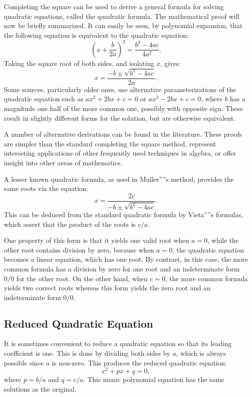Completing the square can be used to derive a general formula for solving quadratic
equations, called the quadratic formula. The mathematical proof will now be briefly
summarized. It can easily be seen, by polynomial expansion, that the following equation is
equivalent to the quadratic equation:
\[
\left(x + \frac{b}{2a}\right)^2 = \frac{b^2 - 4ac}{4a^2}.
\]
Taking the square root of both sides, and isolating $x$, gives:
\[
x = \frac{-b \pm \sqrt{b^2 - 4ac}}{2a}.
\]
Some sources, particularly older ones, use alternative parameterizations of the quadratic equation such as $ax^2 + 2bx + c = 0$ or $ax^2 - 2bx + c = 0$, where $b$ has a magnitude one half of the more common one, possibly with opposite sign. These result in slightly different forms for the solution, but are otherwise equivalent.

A number of alternative derivations can be found in the literature. These proofs are
simpler than the standard completing the square method, represent interesting applications
of other frequently used techniques in algebra, or offer insight into other areas of
mathematics.

A lesser known quadratic formula, as used in Muller''''s method, provides the same roots
via the equation:
\[
x = \frac{2c}{-b \pm \sqrt{b^2 - 4ac}}.
\]
This can be deduced from the standard quadratic formula by Vieta''''s formulas, which assert that the product of the roots is $c/a$.

One property of this form is that it yields one valid root when $a = 0$, while the other root contains division by zero, because when $a = 0$, the quadratic equation becomes a linear equation, which has one root. By contrast, in this case, the more common formula has a division by zero for one root and an indeterminate form $0/0$ for the other root. On the other hand, when $c = 0$, the more common formula yields two correct roots whereas this form yields the zero root and an indeterminate form $0/0$.

\subsection{Reduced Quadratic Equation}
\label{sss:redu-a641}

It is sometimes convenient to reduce a quadratic equation so that its leading coefficient is one. This is done by dividing both sides by $a$, which is always possible since $a$ is non-zero. This produces the reduced quadratic equation:
\[
x^2 + px + q = 0,
\]
where $p = b/a$ and $q = c/a$. This monic polynomial equation has the same solutions as the original.

